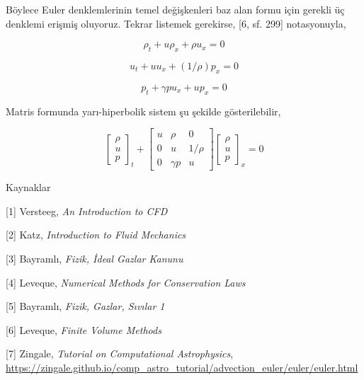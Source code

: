 \documentclass[12pt,fleqn]{article}\usepackage{../../common}
\begin{document}
Böylece Euler denklemlerinin temel değişkenleri baz alan formu için gerekli üç
denklemi erişmiş oluyoruz. Tekrar listemek gerekirse, [6, sf. 299] notasyonuyla,

$$
\rho_t + u \rho_x + \rho u_x = 0
$$

$$
u_t + uu_x + (1/\rho) p_x = 0
$$

$$
p_t + \gamma p u_x + u p_x = 0
$$

Matris formunda yarı-hiperbolik sistem şu şekilde gösterilebilir,

$$
\left[\begin{array}{c}
\rho \\ u \\ p
\end{array}\right]_t +
\left[\begin{array}{ccc}
u & \rho & 0 \\
0 & u & 1/\rho \\
0 & \gamma p & u
\end{array}\right]
\left[\begin{array}{c}
\rho \\ u \\ p
\end{array}\right]_x
= 0
$$

Kaynaklar

[1] Versteeg, {\em An Introduction to CFD}

[2] Katz, {\em Introduction to Fluid Mechanics}

[3] Bayramlı, {\em Fizik, İdeal Gazlar Kanunu}

[4] Leveque, {\em Numerical Methods for Conservation Laws}

[5] Bayramlı, {\em Fizik, Gazlar, Sıvılar 1}

[6] Leveque, {\em Finite Volume Methods}

[7] Zingale, {\em Tutorial on Computational Astrophysics},
    \url{https://zingale.github.io/comp_astro_tutorial/advection_euler/euler/euler.html}
\end{document}
